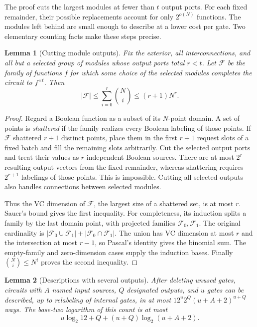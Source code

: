 \documentclass[11pt]{article}
\newtheorem{lemma}[lemma]{Lemma}
\begin{document}
The proof cuts the largest modules at fewer than $t$ output ports.
For each fixed remainder, their possible replacements account for only
$2^{o(N)}$ functions.  The modules left behind are small enough to
describe at a lower cost per gate.  Two elementary counting facts
make these steps precise.

\begin{lemma}[Cutting module outputs]\label{lem:module-cut}
Fix the exterior, all interconnections, and all but a selected group of
modules whose output ports total $r<t$.  Let $\mathcal F$ be the family
of functions $f$ for which some choice of the selected modules completes
the circuit to $f^{\times t}$.  Then
\[
 |\mathcal F|\le\sum_{i=0}^r\binom Ni\le(r+1)N^r.
\]
\end{lemma}

\begin{proof}
Regard a Boolean function as a subset of its $N$-point domain.
A set of points is \emph{shattered} if the family realizes every Boolean
labeling of those points.  If $\mathcal F$ shattered $r+1$ distinct
points, place them in the first
$r+1$ request slots of a fixed batch and fill the remaining slots
arbitrarily.  Cut the selected output ports and treat their values as
$r$ independent Boolean sources.  There are at most $2^r$ resulting
output vectors from the fixed remainder, whereas shattering requires
$2^{r+1}$ labelings of those points.  This is impossible.  Cutting all
selected outputs also handles connections between selected modules.

Thus the VC dimension of $\mathcal F$, the largest size of a shattered
set, is at most $r$.  Sauer's bound
\cite{Sauer1972} gives the first inequality.  For completeness, its
induction splits a family by the last domain point, with projected
families $\mathcal F_0,\mathcal F_1$.  The original cardinality is
$|\mathcal F_0\cup\mathcal F_1|+|\mathcal F_0\cap\mathcal F_1|$.
The union has VC dimension at most $r$ and the intersection at most
$r-1$, so Pascal's identity gives the binomial sum.  The empty-family
and zero-dimension cases supply the induction bases.  Finally
$\binom Ni\le N^i$ proves the second inequality.
\end{proof}

\begin{lemma}[Descriptions with several outputs]\label{lem:multi-output-count}
After deleting unused gates, circuits with $A$ named input sources,
$Q$ designated outputs, and $u$ gates can be described, up to relabeling
of internal gates, in at most $12^u2^Q(u+A+2)^{u+Q}$ ways.
The base-two logarithm of this count is at most
\[
 u\log_2 12+Q+(u+Q)\log_2(u+A+2).
\]
\end{lemma}
\end{document}

